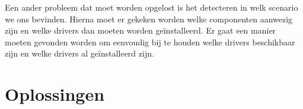 \documentclass{article}
\begin{document}
Een ander probleem dat moet worden opgelost is het detecteren in welk scenario we ons bevinden.
Hierna moet er gekeken worden welke componenten aanwezig zijn en welke drivers dan moeten worden ge\"installeerd.
Er gaat een manier moeten gevonden worden om eenvoudig bij te houden welke drivers beschikbaar zijn en welke drivers al ge\"installeerd zijn.


\section{Oplossingen}
\end{document}

